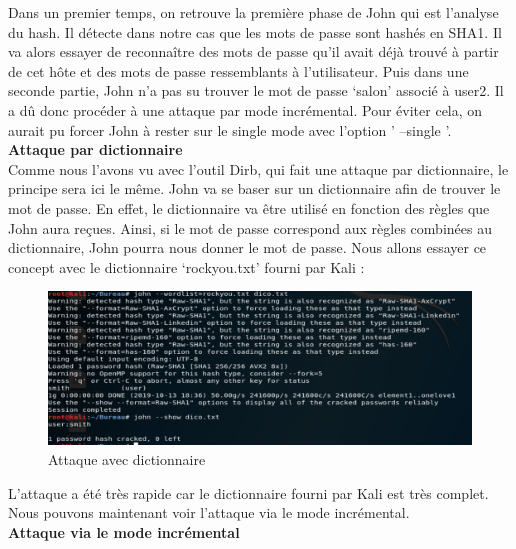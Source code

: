 Dans un premier temps, on retrouve la première phase de John qui est l’analyse du hash. Il détecte dans notre cas que les mots de passe sont hashés en SHA1.
Il va alors essayer de reconnaître des mots de passe qu’il avait déjà trouvé à partir de cet hôte et des mots de passe ressemblants à l’utilisateur.
Puis dans une seconde partie, John n’a pas su trouver le mot de passe ‘salon’ associé à user2. Il a dû donc procéder à une attaque par mode incrémental. Pour éviter cela, on aurait pu forcer John à rester sur le single mode avec l'option ' --single '.\\


\noindent \textbf{Attaque par dictionnaire}\\

Comme nous l’avons vu avec l’outil Dirb, qui fait une attaque par dictionnaire, le principe sera ici le même. John va se baser sur un dictionnaire afin de trouver le mot de passe. En effet, le dictionnaire va être utilisé en fonction des règles que John aura reçues. Ainsi, si le mot de passe correspond aux règles combinées au dictionnaire, John pourra nous donner le mot de passe.
Nous allons essayer ce concept avec le dictionnaire ‘rockyou.txt’ fourni par Kali :

\begin{figure}[htp!]
  \centering
  \setlength\figureheight{7cm}
  \setlength\figurewidth{9cm}
  \includegraphics[width=1\textwidth]{oui/Ancien/imangeancien/john/Dico.PNG}
  \caption{Attaque avec dictionnaire}
  \label{fig:courbe-tikz}
\end{figure}

\vspace{0,8cm}

L’attaque a été très rapide car le dictionnaire fourni par Kali est très complet.
Nous pouvons maintenant voir l’attaque via le mode incrémental.\\

\noindent \textbf{Attaque via le mode incrémental}\\


